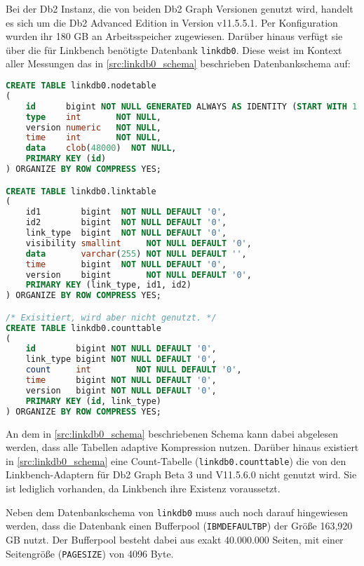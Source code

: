 Bei der Db2 Instanz, die von beiden Db2 Graph Versionen genutzt wird, handelt es sich um die Db2 Advanced Edition in Version v11.5.5.1. Per Konfiguration wurden ihr 180 GB an Arbeitsspeicher zugewiesen. Darüber hinaus verfügt sie über die für Linkbench benötigte Datenbank \texttt{linkdb0}. Diese weist im Kontext aller Messungen das in \autoref{src:linkdb0_schema} beschrieben Datenbankschema auf:

\begin{lstlisting}[label=src:linkdb0_schema,caption={Db2 Instanz Datenbankschema für linkdb0},language=SQL]
CREATE TABLE linkdb0.nodetable
(
    id      bigint NOT NULL GENERATED ALWAYS AS IDENTITY (START WITH 1 INCREMENT BY 1),
    type    int       NOT NULL,
    version numeric   NOT NULL,
    time    int       NOT NULL,
    data    clob(48000)  NOT NULL,
    PRIMARY KEY (id)
) ORGANIZE BY ROW COMPRESS YES;

CREATE TABLE linkdb0.linktable
(
    id1        bigint  NOT NULL DEFAULT '0',
    id2        bigint  NOT NULL DEFAULT '0',
    link_type  bigint  NOT NULL DEFAULT '0',
    visibility smallint     NOT NULL DEFAULT '0',
    data       varchar(255) NOT NULL DEFAULT '',
    time       bigint  NOT NULL DEFAULT '0',
    version    bigint       NOT NULL DEFAULT '0',
    PRIMARY KEY (link_type, id1, id2)
) ORGANIZE BY ROW COMPRESS YES;

/* Exisitiert, wird aber nicht genutzt. */
CREATE TABLE linkdb0.counttable
(
    id        bigint NOT NULL DEFAULT '0',
    link_type bigint NOT NULL DEFAULT '0',
    count     int         NOT NULL DEFAULT '0',
    time      bigint NOT NULL DEFAULT '0',
    version   bigint NOT NULL DEFAULT '0',
    PRIMARY KEY (id, link_type)
) ORGANIZE BY ROW COMPRESS YES;
\end{lstlisting}

An dem in \autoref{src:linkdb0_schema} beschriebenen Schema kann dabei abgelesen werden, dass alle Tabellen adaptive Kompression nutzen. Darüber hinaus existiert in \autoref{src:linkdb0_schema} eine Count-Tabelle (\texttt{linkdb0.counttable}) die von den Linkbench-Adaptern für Db2 Graph Beta 3 und V11.5.6.0 nicht genutzt wird. Sie ist lediglich vorhanden, da Linkbench ihre Existenz voraussetzt. 

Neben dem Datenbankschema von \texttt{linkdb0} muss auch noch darauf hingewiesen werden, dass die Datenbank einen Bufferpool (\texttt{IBMDEFAULTBP}) der Größe 163,920 GB nutzt. Der Bufferpool besteht dabei aus exakt 40.000.000 Seiten, mit einer Seitengröße (\texttt{PAGESIZE}) von 4096 Byte.


